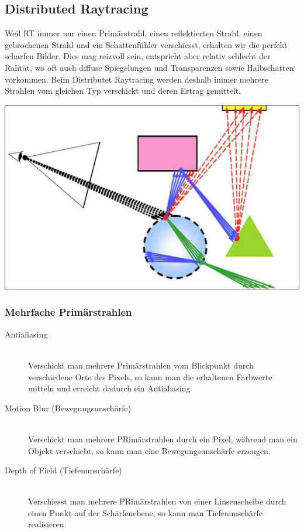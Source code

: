 \documentclass[10pt]{article}
\begin{document}
\subsection{Distributed Raytracing}
Weil RT immer nur einen Primärstrahl, einen reflektierten Strahl, einen gebrochenen Strahl und ein Schattenfühler verschiesst, erhalten wir die perfekt scharfen Bilder. Dies mag reizvoll sein, entspricht aber relativ schlecht der Ralität, wo oft auch diffuse Spiegelungen und Transparenzen sowie Halbschatten vorkommen. Beim Distributet Raytracing werden deshalb immer mehrere Strahlen vom gleichen Typ verschickt und deren Ertrag gemittelt.
\begin{center}
	\includegraphics[scale=0.4]{distributed-raytracing.png}
\end{center}
\subsubsection*{Mehrfache Primärstrahlen}
\begin{description}
	\item[Antialiasing] \hfill \\
		Verschickt man mehrere Primärstrahlen vom Blickpunkt durch verschiedene Orte des Pixels, so kann man die erhaltenen Farbwerte mitteln und erreicht dadurch ein Antialiasing
	\item[Motion Blur (Bewegungsunschärfe)] \hfill \\
		Verschickt man mehrere PRimärstrahlen durch ein Pixel, während man ein Objekt verschiebt, so kann man eine Bewegungsunschärfe erzeugen.
	\item[Depth of Field (Tiefenunschärfe)] \hfill \\
		Verschiesst man mehrere PRimärstrahlen von einer Linsenscheibe durch einen Punkt auf der Schärfenebene, so kann man Tiefenunschärfe realisieren.
\end{description}
\end{document}
